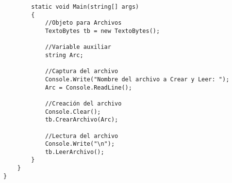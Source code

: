 \documentclass[letterpaper, 12pt]{article}
\begin{document}
\begin{justify}
\begin{verbatim}
        static void Main(string[] args)
        {
            //Objeto para Archivos
            TextoBytes tb = new TextoBytes();

            //Variable auxiliar
            string Arc;

            //Captura del archivo
            Console.Write("Nombre del archivo a Crear y Leer: ");
            Arc = Console.ReadLine();

            //Creación del archivo
            Console.Clear();
            tb.CrearArchivo(Arc);

            //Lectura del archivo
            Console.Write("\n");
            tb.LeerArchivo();
        }
    }
}
        \end{verbatim}
    \end{justify}

    \newpage
        \printbibliography[heading=bibintoc]    
\end{document}
